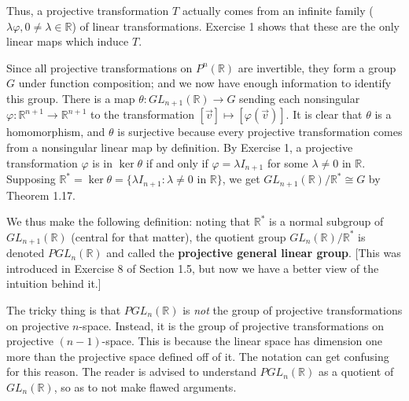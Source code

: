 \documentclass[leqno]{book}
\begin{document}
Thus, a projective transformation $T$ actually comes from an infinite family ($\lambda\varphi,0\ne\lambda\in\mathbb R$) of linear transformations.  Exercise 1 shows that these are the only linear maps which induce $T$.

Since all projective transformations on $P^n(\mathbb R)$ are invertible, they form a group $G$ under function composition; and we now have enough information to identify this group.  There is a map $\theta:GL_{n+1}(\mathbb R)\to G$ sending each nonsingular $\varphi:\mathbb R^{n+1}\to\mathbb R^{n+1}$ to the transformation $[\vec v]\mapsto[\varphi(\vec v)]$.  It is clear that $\theta$ is a homomorphism, and $\theta$ is surjective because every projective transformation comes from a nonsingular linear map by definition.  By Exercise 1, a projective transformation $\varphi$ is in $\ker\theta$ if and only if $\varphi=\lambda I_{n+1}$ for some $\lambda\ne 0$ in $\mathbb R$.  Supposing $\mathbb R^*=\ker\theta=\{\lambda I_{n+1}:\lambda\ne 0\text{ in }\mathbb R\}$, we get $GL_{n+1}(\mathbb R)/\mathbb R^*\cong G$ by Theorem 1.17.

We thus make the following definition: noting that $\mathbb R^*$ is a normal subgroup of $GL_{n+1}(\mathbb R)$ (central for that matter), the quotient group $GL_n(\mathbb R)/\mathbb R^*$ is denoted $PGL_n(\mathbb R)$ and called the \textbf{projective general linear group}.  [This was introduced in Exercise 8 of Section 1.5, but now we have a better view of the intuition behind it.]

The tricky thing is that $PGL_n(\mathbb R)$ is \emph{not} the group of projective transformations on projective $n$-space.  Instead, it is the group of projective transformations on projective $(n-1)$-space.  This is because the linear space has dimension one more than the projective space defined off of it.  The notation can get confusing for this reason.  The reader is advised to understand $PGL_n(\mathbb R)$ as a quotient of $GL_n(\mathbb R)$, so as to not make flawed arguments.
\end{document}
